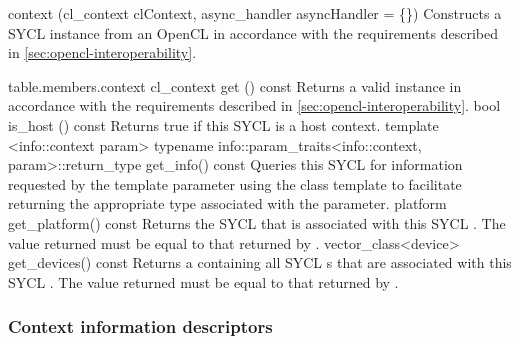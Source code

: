   \addRowTwoL
    {context (cl_context clContext,}
    {async_handler asyncHandler = \{\})}
    {    
      Constructs a SYCL  instance from an OpenCL  in accordance with the requirements described in \ref{sec:opencl-interoperability}.
    }
\completeTable

{table.members.context}
  \addRow
    {cl_context get () const}
    { 
      Returns a valid  instance in accordance with the requirements described in \ref{sec:opencl-interoperability}.  
    }
  \addRow
    {bool is_host () const}
    {
      Returns true if this SYCL  is a host context.
    }
  \addRowTwoL
    {template <info::context param> typename info::param_traits<info::context, param>::return_type}
    {  get_info() const}
    {
      Queries this SYCL  for information requested by the template parameter  using the  class template to facilitate returning the appropriate type associated with the  parameter.
    }
  \addRow
    {platform get_platform() const}
    {
      Returns the SYCL  that is associated with this SYCL . The value returned must be equal to that returned by .
    }
  \addRowTwoL
    {vector_class<device>}
    {get_devices() const}
    {
      Returns a  containing all SYCL s that are associated with this SYCL . The value returned must be equal to that returned by .
    }
\completeTable


\subsubsection{Context information descriptors}

